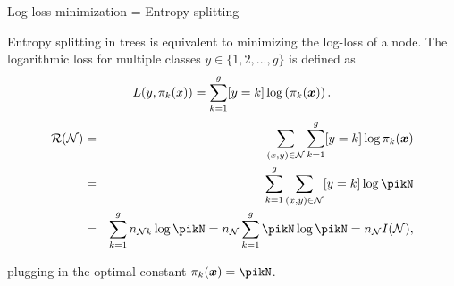 \begin{vbframe}{Log loss minimization = Entropy splitting}

Entropy splitting in trees is equivalent to minimizing the log-loss of a node. The logarithmic loss for multiple classes $y \in \{1, 2, ..., g\}$ is defined as
$$ L(y, \pi_k(x)) = \sum_{k = 1}^g [y = k] \log \left(\pi_k(\bm{x})\right). $$
\vspace{-0.4cm}
\begin{eqnarray*}
\risk(\Np) &=& \sum_{\xy \in \Np}  \sum_{k = 1}^g [y = k] \log \pi_k(\xv) \\
&=& \sum_{k = 1}^g \sum_{\xy \in \Np} [y = k] \log \pikN \\
&=& \sum_{k = 1}^g n_{\Np k} \log \pikN = n_{\Np} \sum_{k = 1}^g \pikN \log \pikN = n_\Np I(\Np), 
\end{eqnarray*} 

plugging in the optimal constant $\pi_k(\xv) = \pikN$.




\end{vbframe}














